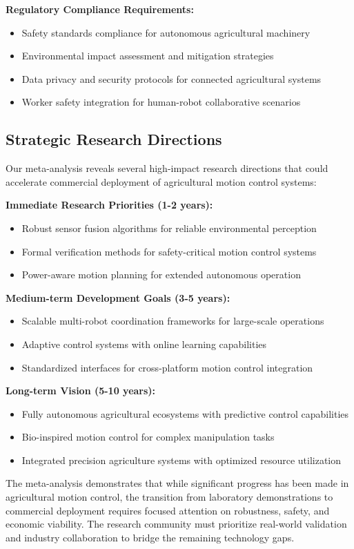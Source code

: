 \textbf{Regulatory Compliance Requirements:}
\begin{itemize}
    \item Safety standards compliance for autonomous agricultural machinery
    \item Environmental impact assessment and mitigation strategies
    \item Data privacy and security protocols for connected agricultural systems
    \item Worker safety integration for human-robot collaborative scenarios
\end{itemize}

\subsection{Strategic Research Directions}
\label{subsec:motion_strategic_directions}

Our meta-analysis reveals several high-impact research directions that could accelerate commercial deployment of agricultural motion control systems:

\textbf{Immediate Research Priorities (1-2 years):}
\begin{itemize}
    \item Robust sensor fusion algorithms for reliable environmental perception
    \item Formal verification methods for safety-critical motion control systems
    \item Power-aware motion planning for extended autonomous operation
\end{itemize}

\textbf{Medium-term Development Goals (3-5 years):}
\begin{itemize}
    \item Scalable multi-robot coordination frameworks for large-scale operations
    \item Adaptive control systems with online learning capabilities
    \item Standardized interfaces for cross-platform motion control integration
\end{itemize}

\textbf{Long-term Vision (5-10 years):}
\begin{itemize}
    \item Fully autonomous agricultural ecosystems with predictive control capabilities
    \item Bio-inspired motion control for complex manipulation tasks
    \item Integrated precision agriculture systems with optimized resource utilization
\end{itemize}

The meta-analysis demonstrates that while significant progress has been made in agricultural motion control, the transition from laboratory demonstrations to commercial deployment requires focused attention on robustness, safety, and economic viability. The research community must prioritize real-world validation and industry collaboration to bridge the remaining technology gaps.